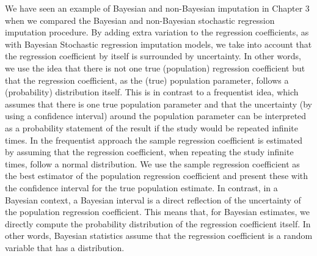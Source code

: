 \documentclass[]{book}
\begin{document}
We have seen an example of Bayesian and non-Bayesian imputation in
Chapter 3 when we compared the Bayesian and non-Bayesian stochastic
regression imputation procedure. By adding extra variation to the
regression coefficients, as with Bayesian Stochastic regression
imputation models, we take into account that the regression coefficient
by itself is surrounded by uncertainty. In other words, we use the idea
that there is not one true (population) regression coefficient but that
the regression coefficient, as the (true) population parameter, follows
a (probability) distribution itself. This is in contrast to a
frequentist idea, which assumes that there is one true population
parameter and that the uncertainty (by using a confidence interval)
around the population parameter can be interpreted as a probability
statement of the result if the study would be repeated infinite times.
In the frequentist approach the sample regression coefficient is
estimated by assuming that the regression coefficient, when repeating
the study infinite times, follow a normal distribution. We use the
sample regression coefficient as the best estimator of the population
regression coefficient and present these with the confidence interval
for the true population estimate. In contrast, in a Bayesian context, a
Bayesian interval is a direct reflection of the uncertainty of the
population regression coefficient. This means that, for Bayesian
estimates, we directly compute the probability distribution of the
regression coefficient itself. In other words, Bayesian statistics
assume that the regression coefficient is a random variable that has a
distribution.
\end{document}
